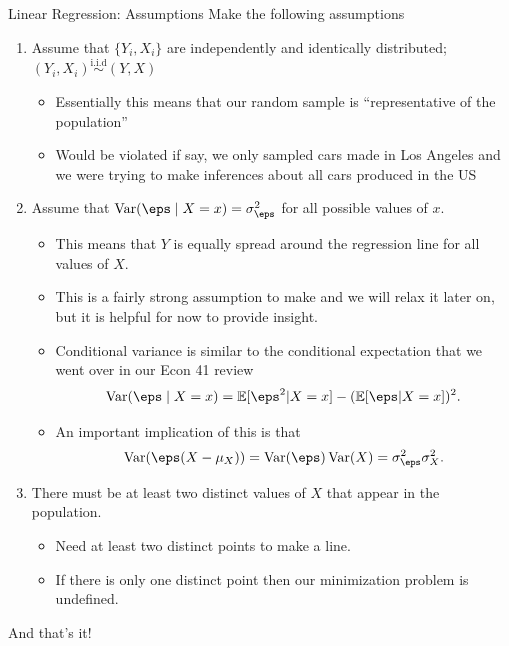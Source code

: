 \documentclass[notheorems, 9pt]{beamer}
\begin{document}
\begin{frame}{Linear Regression: Assumptions} 
	\label{frame:assm-2}
	Make the following assumptions
	\begin{enumerate}
		\item<1->  Assume that \(\{Y_i,X_i\}\) are independently and identically distributed; \((Y_i,X_i) \overset{\text{i.i.d}}{\sim} (Y,X)\)
		\begin{itemize}
			\item<1|only@1> Essentially this means that our random sample is ``representative of the population'' 
			\item<1|only@1> Would be violated if say, we only sampled cars made in Los Angeles and we were trying to make inferences about all cars produced in the US
		\end{itemize}
		\item<2->  Assume that \(\Var(\eps\mid X=x) = \sigma_\eps^2 \) for all possible values of \(x\).
		\begin{itemize}
			\item<2|only@2> This means that \(Y\) is equally spread around the regression line for all values of \(X\).
			\item<2|only@2> This is a fairly strong assumption to make and we will relax it later on, but it is helpful for now to provide insight.
			\item<2|only@2> Conditional variance is similar to the conditional expectation that we went over in our Econ 41 review
			\[
				{\Var(\eps\mid X=x) = \E[\eps^2|X=x] - (\E[\eps|X=x])^2}
			.\] 
			\item<2->An important implication of this is that
			\[
				\Var(\eps(X-\mu_X)) = \Var(\eps)\Var(X) = \sigma_\eps^2\sigma_X^2
			.\] 
			\only<2>{\green{Questions?}}
		\end{itemize}
		\item<3->  There must be at least two distinct values of \(X\) that appear in the population.
		\begin{itemize}
			\item<3|only@3> Need at least two distinct points to make a line. 
			\item<3|only@3> If there is only one distinct point then our minimization problem is undefined.
		\end{itemize}
	\end{enumerate}
	And that's it!
\end{frame}
\end{document}
